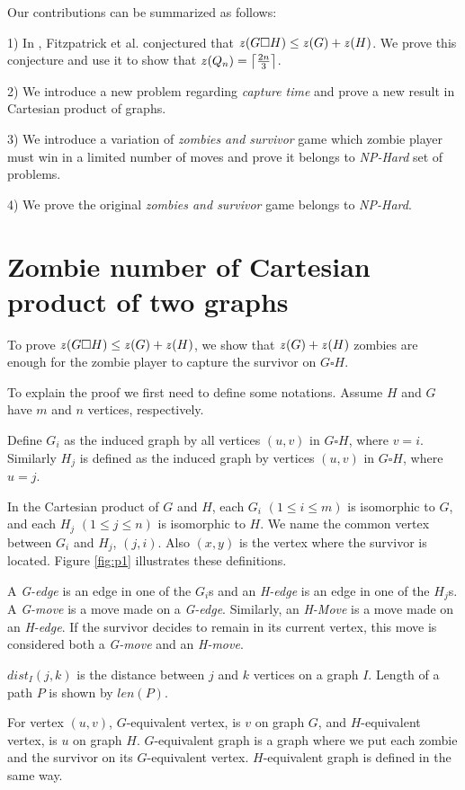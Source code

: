 \documentclass[1p]{elsarticle}
\DeclarePairedDelimiter\ceil{\lceil}{\rceil} \DeclarePairedDelimiter\floor{\lfloor}{\rfloor}
\newcommand{\zn}{\ooalign{$z$\cr\hfil\rule[.5ex]{.2em}{.08ex}\hfil\cr}}
\begin{document}
Our contributions can be summarized as follows:

1) In \cite{Fitz16}, Fitzpatrick et al. conjectured that $\zn(G \square H) \leq \zn(G) + \zn(H)$. We prove this conjecture and
use it to show that $\zn(Q_n) = \ceil*{\frac{2n}{3}}$. 

2) We introduce a new problem regarding {\it capture time} and prove a new result in Cartesian product of graphs.

3) We introduce a variation of {\it zombies and survivor} game which zombie player must win in a limited number of
moves and prove it belongs to {\it NP-Hard} set of problems.

4) We prove the original {\it zombies and survivor} game belongs to {\it NP-Hard}.


\section{Zombie number of Cartesian product of two graphs}\label{conj-proof}

To prove $\zn(G \square H) \leq \zn(G) + \zn(H)$, we show that $\zn(G) + \zn(H)$ zombies are enough for the zombie player to
capture the survivor on $G \square H$.

To explain the proof we first need to define some notations. Assume $H$ and $G$ have $m$ and $n$ vertices,
respectively. 

Define $G_{i}$ as the induced graph by all vertices $(u,v)$ in $G \square H$, where $v=i$. Similarly
$H_{j}$ is defined as the induced graph by vertices $(u,v)$ in $G \square H$, where $u=j$.

In the Cartesian product of $G$ and $H$, each $G_{i}$ $(1 \leq i \leq m)$ is isomorphic to $G$, and each $H_{j}$ $(1
\leq j \leq n)$ is isomorphic to $H$. We name the common vertex between $G_{i}$ and $H_{j}$, $(j,i)$. Also $(x,y)$ is
the vertex where the survivor is located. Figure \ref{fig:p1} illustrates these definitions.

A {\it G-edge} is an edge in one of the $G_{i}$s and an {\it H-edge} is an edge in one of the $H_{j}$s. A {\it G-move}
is a move made on a {\it G-edge}. Similarly, an {\it H-Move} is a move made on an {\it H-edge}. If the survivor decides
to remain in its current vertex, this move is considered both a {\it G-move} and an {\it H-move}. 

$dist_I(j,k)$ is the distance between $j$ and $k$ vertices on a graph $I$. Length of a path $P$ is shown by $len(P)$. 

For vertex $(u,v)$, $G$-equivalent vertex, is $v$ on graph $G$, and $H$-equivalent vertex, is $u$ on graph $H$.
$G$-equivalent graph is a graph where we put each zombie and the survivor on its $G$-equivalent vertex. $H$-equivalent
graph is defined in the same way.
\end{document}
